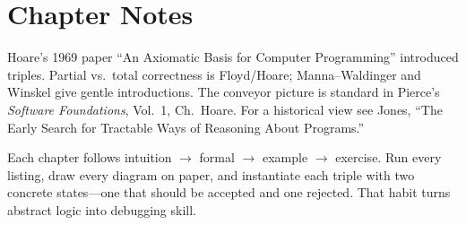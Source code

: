 \section*{Chapter Notes}
Hoare's 1969 paper ``An Axiomatic Basis for Computer Programming'' introduced triples. Partial vs.\ total correctness is Floyd/Hoare; Manna--Waldinger and Winskel give gentle introductions. The conveyor picture is standard in Pierce's \emph{Software Foundations}, Vol.~1, Ch.~Hoare. For a historical view see Jones, ``The Early Search for Tractable Ways of Reasoning About Programs.''

\smallskip
\begin{remark}
Each chapter follows intuition $\to$ formal $\to$ example $\to$ exercise. Run every listing, draw every diagram on paper, and instantiate each triple with two concrete states—one that should be accepted and one rejected. That habit turns abstract logic into debugging skill.
\end{remark}
